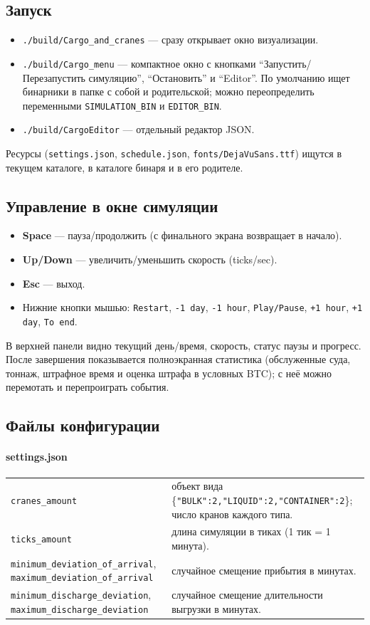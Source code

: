 \documentclass[12pt,a4paper]{article}
\begin{document}
\subsection{Запуск}
\begin{itemize}[noitemsep]
    \item \verb|./build/Cargo_and_cranes| — сразу открывает окно визуализации.
    \item \verb|./build/Cargo_menu| — компактное окно с кнопками ``Запустить/Перезапустить симуляцию'', ``Остановить'' и ``Editor''. По умолчанию ищет бинарники в папке с собой и родительской; можно переопределить переменными \verb|SIMULATION_BIN| и \verb|EDITOR_BIN|.
    \item \verb|./build/CargoEditor| — отдельный редактор JSON.
\end{itemize}
Ресурсы (\verb|settings.json|, \verb|schedule.json|, \verb|fonts/DejaVuSans.ttf|) ищутся в текущем каталоге, в каталоге бинаря и в его родителе.

\subsection{Управление в окне симуляции}
\begin{itemize}[noitemsep]
    \item \textbf{Space} — пауза/продолжить (с финального экрана возвращает в начало).
    \item \textbf{Up/Down} — увеличить/уменьшить скорость (ticks/sec).
    \item \textbf{Esc} — выход.
    \item Нижние кнопки мышью: \texttt{Restart}, \texttt{-1 day}, \texttt{-1 hour}, \texttt{Play/Pause}, \texttt{+1 hour}, \texttt{+1 day}, \texttt{To end}.
\end{itemize}
В верхней панели видно текущий день/время, скорость, статус паузы и прогресс. После завершения показывается полноэкранная статистика (обслуженные суда, тоннаж, штрафное время и оценка штрафа в условных BTC); с неё можно перемотать и перепроиграть события.

\subsection{Файлы конфигурации}
\paragraph{settings.json}
\begin{longtable}{p{4cm}p{10cm}}
\texttt{cranes\_amount} & объект вида \{\texttt{"BULK":2,"LIQUID":2,"CONTAINER":2}\}; число кранов каждого типа. \\
\texttt{ticks\_amount} & длина симуляции в тиках (1 тик = 1 минута). \\
\texttt{minimum\_deviation\_of\_arrival}, \texttt{maximum\_deviation\_of\_arrival} & случайное смещение прибытия в минутах. \\
\texttt{minimum\_discharge\_deviation}, \texttt{maximum\_discharge\_deviation} & случайное смещение длительности выгрузки в минутах. \\
\end{longtable}
\end{document}
